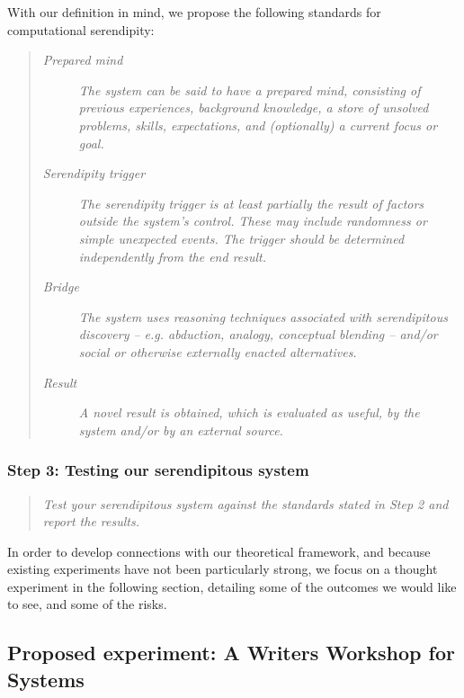 \documentclass{llncs}
\begin{document}
With our definition in mind, we propose the following standards for
computational serendipity:

\begin{quote}
\begin{description}
\item[\emph{Prepared mind}] \emph{The system can be said to have a
  prepared mind, consisting of previous experiences, background
  knowledge, a store of unsolved problems, skills, expectations, and
  (optionally) a current focus or goal.}
\item[\emph{Serendipity trigger}] \emph{The serendipity trigger is at
  least partially the result of factors outside the system's control.
  These may include randomness or simple unexpected events.  The
  trigger should be determined independently from the end result.}
\item[\emph{Bridge}] \emph{The system uses reasoning techniques
  associated with serendipitous discovery -- e.g.  abduction, analogy,
  conceptual blending -- and/or social or otherwise externally enacted
  alternatives.}
\item[\emph{Result}] \emph{A novel result is obtained, which is
  evaluated as useful, by the system and/or by an external source.}
\end{description}
\end{quote}

\subsubsection*{Step 3: Testing our serendipitous system}

\begin{quote} {\em Test your serendipitous system against the standards stated in Step 2 and report the
results.}\end{quote}

In order to develop connections with our theoretical framework, and
because existing experiments have not been particularly strong, we
focus on a thought experiment in the following section, detailing some
of the outcomes we would like to see, and some of the risks.

\subsection{Proposed experiment: A Writers Workshop for Systems} \label{sec:writers-workshop}
\end{document}
